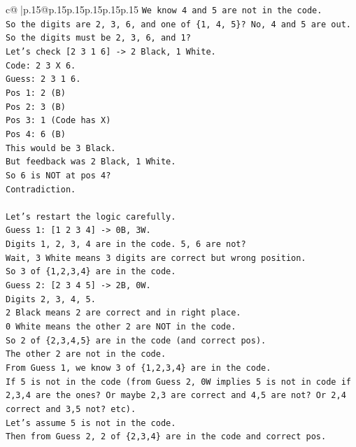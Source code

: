 \documentclass{article}
\begin{document}
{\begin{supertabular}{c@{$\;$}|p{.15\linewidth}@{}p{.15\linewidth}p{.15\linewidth}p{.15\linewidth}p{.15\linewidth}p{.15\linewidth}}
{{{\texttt{We know 4 and 5 are not in the code.} \\
\texttt{So the digits are 2, 3, 6, and one of \{1, 4, 5\}? No, 4 and 5 are out.} \\
\texttt{So the digits must be 2, 3, 6, and 1?} \\
\texttt{Let's check {[}2 3 1 6{]} {-}> 2 Black, 1 White.} \\
\texttt{Code: 2 3 X 6.} \\
\texttt{Guess: 2 3 1 6.} \\
\texttt{Pos 1: 2 (B)} \\
\texttt{Pos 2: 3 (B)} \\
\texttt{Pos 3: 1 (Code has X)} \\
\texttt{Pos 4: 6 (B)} \\
\texttt{This would be 3 Black.} \\
\texttt{But feedback was 2 Black, 1 White.} \\
\texttt{So 6 is NOT at pos 4?} \\
\texttt{Contradiction.} \\
\\ 
\texttt{Let's restart the logic carefully.} \\
\texttt{Guess 1: {[}1 2 3 4{]} {-}> 0B, 3W.} \\
\texttt{Digits 1, 2, 3, 4 are in the code. 5, 6 are not?} \\
\texttt{Wait, 3 White means 3 digits are correct but wrong position.} \\
\texttt{So 3 of \{1,2,3,4\} are in the code.} \\
\texttt{Guess 2: {[}2 3 4 5{]} {-}> 2B, 0W.} \\
\texttt{Digits 2, 3, 4, 5.} \\
\texttt{2 Black means 2 are correct and in right place.} \\
\texttt{0 White means the other 2 are NOT in the code.} \\
\texttt{So 2 of \{2,3,4,5\} are in the code (and correct pos).} \\
\texttt{The other 2 are not in the code.} \\
\texttt{From Guess 1, we know 3 of \{1,2,3,4\} are in the code.} \\
\texttt{If 5 is not in the code (from Guess 2, 0W implies 5 is not in code if 2,3,4 are the ones? Or maybe 2,3 are correct and 4,5 are not? Or 2,4 correct and 3,5 not? etc).} \\
\texttt{Let's assume 5 is not in the code.} \\
\texttt{Then from Guess 2, 2 of \{2,3,4\} are in the code and correct pos.} \\
}}}
\end{supertabular}}
\end{document}
